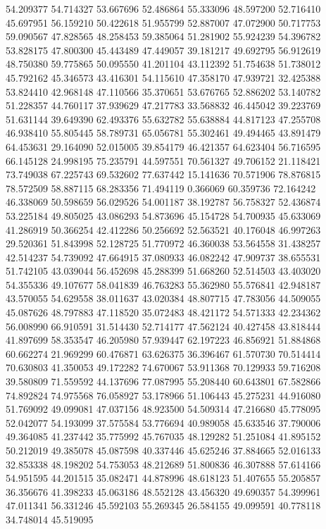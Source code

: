 54.209377
54.714327
53.667696
52.486864
55.333096
48.597200
52.716410
45.697951
56.159210
50.422618
51.955799
52.887007
47.072900
50.717753
59.090567
47.828565
48.258453
59.385064
51.281902
55.924239
54.396782
53.828175
47.800300
45.443489
47.449057
39.181217
49.692795
56.912619
48.750380
59.775865
50.095550
41.201104
43.112392
51.754638
51.738012
45.792162
45.346573
43.416301
54.115610
47.358170
47.939721
32.425388
53.824410
42.968148
47.110566
35.370651
53.676765
52.886202
53.140782
51.228357
44.760117
37.939629
47.217783
33.568832
46.445042
39.223769
51.631144
39.649390
62.493376
55.632782
55.638884
44.817123
47.255708
46.938410
55.805445
58.789731
65.056781
55.302461
49.494465
43.891479
64.453631
29.164090
52.015005
39.854179
46.421357
64.623404
56.716595
66.145128
24.998195
75.235791
44.597551
70.561327
49.706152
21.118421
73.749038
67.225743
69.532602
77.637442
15.141636
70.571906
78.876815
78.572509
58.887115
68.283356
71.494119
0.366069
60.359736
72.164242
46.338069
50.598659
56.029526
54.001187
38.192787
56.758327
52.436874
53.225184
49.805025
43.086293
54.873696
45.154728
54.700935
45.633069
41.286919
50.366254
42.412286
50.256692
52.563521
40.176048
46.997263
29.520361
51.843998
52.128725
51.770972
46.360038
53.564558
31.438257
42.514237
54.739092
47.664915
37.080933
46.082242
47.909737
38.655531
51.742105
43.039044
56.452698
45.288399
51.668260
52.514503
43.403020
54.355336
49.107677
58.041839
46.763283
55.362980
55.576841
42.948187
43.570055
54.629558
38.011637
43.020384
48.807715
47.783056
44.509055
45.087626
48.797883
47.118520
35.072483
48.421172
54.571333
42.234362
56.008990
66.910591
31.514430
52.714177
47.562124
40.427458
43.818444
41.897699
58.353547
46.205980
57.939447
62.197223
46.856921
51.884868
60.662274
21.969299
60.476871
63.626375
36.396467
61.570730
70.514414
70.630803
41.350053
49.172282
74.670067
53.911368
70.129933
59.716208
39.580809
71.559592
44.137696
77.087995
55.208440
60.643801
67.582866
74.892824
74.975568
76.058927
53.178966
51.106443
45.275231
44.916080
51.769092
49.099081
47.037156
48.923500
54.509314
47.216680
45.778095
52.042077
54.193099
37.575584
53.776694
40.989058
45.633546
37.790006
49.364085
41.237442
35.775992
45.767035
48.129282
51.251084
41.895152
50.212019
49.385078
45.087598
40.337446
45.625246
37.884665
52.016133
32.853338
48.198202
54.753053
48.212689
51.800836
46.307888
57.614166
54.951595
44.201515
35.082471
44.878996
48.618123
51.407655
55.205857
36.356676
41.398233
45.063186
48.552128
43.456320
49.690357
54.399961
47.011341
56.331246
45.592103
55.269345
26.584155
49.099591
40.778118
34.748014
45.519095
